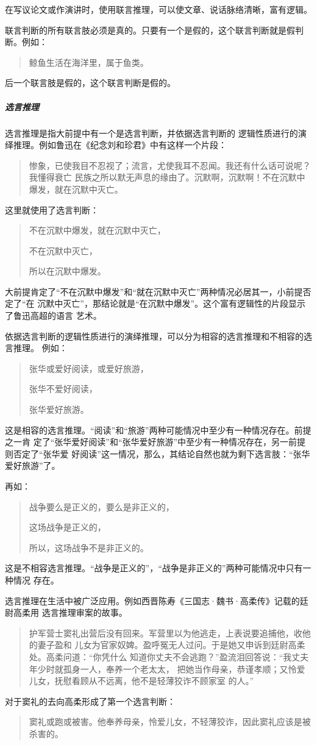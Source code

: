\documentclass[final,oneside]{ctexbook}
\newenvironment{equotation}{\begin{quotation}\kaishu}{\end{quotation}}
\begin{document}
在写议论文或作演讲时，使用联言推理，可以使文章、说话脉络清晰，富有逻辑。

联言判断的所有联言肢必须是真的。只要有一个是假的，这个联言判断就是假判断。例如：
\begin{equotation}
  鲸鱼生活在海洋里，属于鱼类。
\end{equotation}
后一个联言肢是假的，这个联言判断是假的。

\subparagraph{选言推理} 选言推理是指大前提中有一个是选言判断，并依据选言判断的
逻辑性质进行的演绎推理。例如鲁迅在《纪念刘和珍君》中有这样一个片段：
\begin{equotation}
  惨象，已使我目不忍视了；流言，尤使我耳不忍闻。我还有什么话可说呢？我懂得衰亡
  民族之所以默无声息的缘由了。沉默啊，沉默啊！不在沉默中爆发，就在沉默中灭亡。
\end{equotation}
这里就使用了选言判断：

\begin{equotation}
  不在沉默中爆发，就在沉默中灭亡，

  不在沉默中灭亡，

  所以在沉默中爆发。
\end{equotation}
大前提肯定了“不在沉默中爆发”和“就在沉默中灭亡”两种情况必居其一，小前提否定了“在
沉默中灭亡”，那结论就是“在沉默中爆发”。这个富有逻辑性的片段显示了鲁迅高超的语言
艺术。

依据选言判断的逻辑性质进行的演绎推理，可以分为相容的选言推理和不相容的选言推理。
例如：
\begin{equotation}
  张华或爱好阅读，或爱好旅游，

  张华不爱好阅读，

  张华爱好旅游。
\end{equotation}
这是相容的选言推理。“阅读”和“旅游”两种可能情况中至少有一种情况存在。前提之一肯
定了“张华爱好阅读”和“张华爱好旅游”中至少有一种情况存在，另一前提则否定了“张华爱
好阅读”这一情况，那么，其结论自然也就为剩下选言肢：“张华爱好旅游”了。

再如：
\begin{equotation}
  战争要么是正义的，要么是非正义的，

  这场战争是正义的，

  所以，这场战争不是非正义的。
\end{equotation}
这是不相容选言推理。“战争是正义的”，“战争是非正义的”两种可能情况中只有一种情况
存在。

选言推理在生活中被广泛应用。例如西晋陈寿《三国志·魏书·高柔传》记载的廷尉高柔用
选言推理审案的故事。
\begin{equotation}
  护军营士窦礼出营后没有回来。军营里以为他逃走，上表说要追捕他，收他的妻子盈和
  儿女为官家奴婢。盈呼冤无人过问。于是她又申诉到廷尉高柔处。高柔问道：“你凭什么
  知道你丈夫不会逃跑？”盈流泪回答说：“我丈夫年少时就孤身一人，奉养一个老太太，
  把她当作母亲，恭谨孝顺；又怜爱儿女，抚慰看顾从不远离，他不是轻薄狡诈不顾家室
  的人。”
\end{equotation}
对于窦礼的去向高柔形成了第一个选言判断：
\begin{equotation}
  窦礼或跑或被害。他奉养母亲，怜爱儿女，不轻薄狡诈，因此窦礼应该是被杀害的。
\end{equotation}
\end{document}
